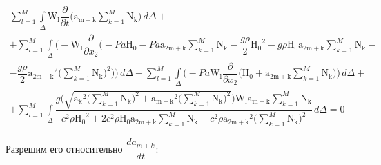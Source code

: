 \documentclass[14pt]{extreport}
\begin{document}
\begin{multline*}
 \sum_{l=1}^{M} \int\limits_{\Delta} \operatorname{W_{l}} \dfrac{\partial}{\partial t}\bigg(\operatorname{a_{m+k}} \sum_{k=1}^{M} \operatorname{N_{k}}\bigg)\, d\Delta +\\+ \sum_{l=1}^{M} \int\limits_{\Delta} \bigg(- \operatorname{W_{l}} \dfrac{\partial}{\partial x_{2}}\bigg(- Pa \operatorname{H_{0}} - Pa \operatorname{a_{2m+k}} \sum_{k=1}^{M} \operatorname{N_{k}} - \dfrac{g \rho}{2} \operatorname{H_{0}}^{2} - g \rho \operatorname{H_{0}} \operatorname{a_{2m+k}} \sum\limits_{k=1}^{M} \operatorname{N_{k}} -\\- \dfrac{g \rho}{2} \operatorname{a_{2m+k}}^{2} \bigg(\sum\limits_{k=1}^{M} \operatorname{N_{k}}\bigg)^{2}\bigg)\bigg)\, d\Delta + \sum\limits_{l=1}^{M} \int\limits_{\Delta} \bigg(- Pa \operatorname{W_{l}} \dfrac{\partial}{\partial x_{2}}\bigg(\operatorname{H_{0}} + \operatorname{a_{2m+k}} \sum\limits_{k=1}^{M} \operatorname{N_{k}}\bigg)\bigg)\, d\Delta + \\ + \sum\limits_{l=1}^{M} \int\limits_{\Delta} \dfrac{g \bigg(\sqrt{\operatorname{a_{k}}^{2} \bigg(\sum\limits_{k=1}^{M} \operatorname{N_{k}}\bigg)^{2} + \operatorname{a_{m+k}}^{2} \bigg(\sum\limits_{k=1}^{M} \operatorname{N_{k}}\bigg)^{2}}\bigg) \operatorname{W_{l}} \operatorname{a_{m+k}} \sum\limits_{k=1}^{M} \operatorname{N_{k}}}{c^{2} \rho \operatorname{H_{0}}^{2} + 2 c^{2} \rho \operatorname{H_{0}} \operatorname{a_{2m+k}} \sum\limits_{k=1}^{M} \operatorname{N_{k}} + c^{2} \rho \operatorname{a_{2m+k}}^{2} \bigg(\sum\limits_{k=1}^{M} \operatorname{N_{k}}\bigg)^{2}}\, d\Delta = 0
\end{multline*}

Разрешим его относительно $\dfrac{da_{m+k}}{dt}$:
\end{document}
